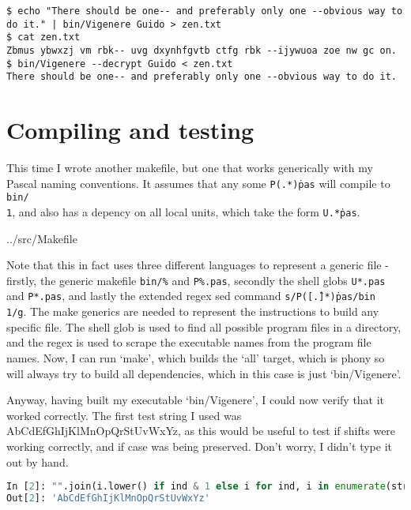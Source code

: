 \documentclass[fleqn,a4paper,11pt]{article}
\begin{document}
\begin{lstlisting}[caption=Use of an output file]
$ echo "There should be one-- and preferably only one --obvious way to do it." | bin/Vigenere Guido > zen.txt
$ cat zen.txt
Zbmus ybwxzj vm rbk-- uvg dxynhfgvtb ctfg rbk --ijywuoa zoe nw gc on.
$ bin/Vigenere --decrypt Guido < zen.txt
There should be one-- and preferably only one --obvious way to do it.
\end{lstlisting}
\iffalse $ \fi %

    \section{Compiling and testing}

    This time I wrote another makefile, but one that works generically with my
    Pascal naming conventions. It assumes that any some \texttt{P(.*)\.pas} will
    compile to \texttt{bin/\\1}, and also has a depency on all local units, which
    take the form \texttt{U.*\.pas}.


{../src/Makefile}

    Note that this in fact uses three different languages to represent a generic
    file - firstly, the generic makefile \texttt{bin/\%} and \texttt{P\%.pas},
    secondly the shell globs \texttt{U*.pas} and \texttt{P*.pas}, and lastly the
    extended regex sed command \texttt{s/P([\^.]*)\.pas/bin\/\\1/g}. The make
    generics are needed to represent the instructions to build any specific
    file. The shell glob is used to find all possible program files in a
    directory, and the regex is used to scrape the executable names from the
    program file names. Now, I can run `make', which builds the `all' target,
    which is phony so will always try to build all dependencies, which in this
    case is just `bin/Vigenere'.

    Anyway, having built my executable `bin/Vigenere', I could now verify that
    it worked correctly. The first test string I used was
    AbCdEfGhIjKlMnOpQrStUvWxYz, as this would be useful to test if shifts were
    working correctly, and if case was being preserved. Don't worry, I didn't
    type it out by hand.

\begin{lstlisting}[language=Python, caption=Alphabet]
In [2]: "".join(i.lower() if ind & 1 else i for ind, i in enumerate(string.ascii_uppercase))
Out[2]: 'AbCdEfGhIjKlMnOpQrStUvWxYz'
\end{lstlisting}
\end{document}
